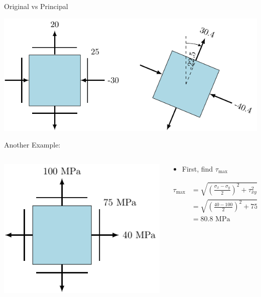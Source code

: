 \documentclass[10pt, svgnames]{beamer}
\begin{document}
\begin{frame}[label={sec:orgebaab26}]{Original vs Principal}
\begin{center}
\includegraphics[width=.9\linewidth]{pictures/orig-vs-principal-I.pdf}
\end{center}
\end{frame}

\begin{frame}[label={sec:org6fbd44f}]{Another Example:}
\begin{columns}
\begin{column}{0.4\columnwidth}
\begin{center}
\includegraphics[width=\textwidth]{pictures/example-II-prob.pdf}
\end{center}
\end{column}

\begin{column}{0.6\columnwidth}
\begin{itemize}
\item First, find \(\tau_{\max}\)
\end{itemize}

\begin{align*}
  \tau_{\max} &= \sqrt {\left( \frac{\sigma_x - \sigma_y}{2} \right)^2 + \tau _{xy}^2}  \\
              &= \sqrt {\left( \frac{40 - 100}{2} \right)^2 + 75^2}  \\
              &= 80.8 \text{ MPa}
\end{align*}
\end{column}
\end{columns}
\end{frame}
\end{document}
